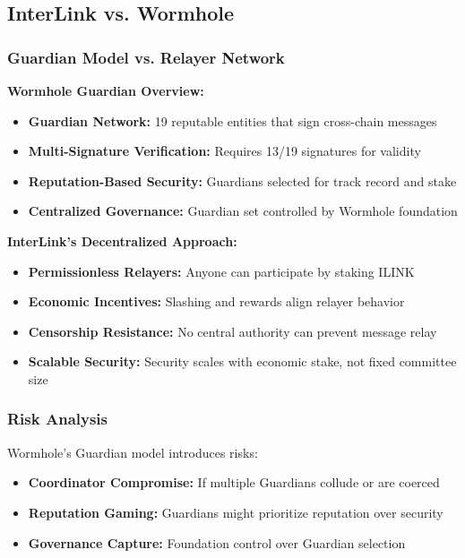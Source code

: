 \documentclass[11pt,a4paper]{article}
\begin{document}
\subsection{InterLink vs. Wormhole}

\subsubsection{Guardian Model vs. Relayer Network}

\textbf{Wormhole Guardian Overview:}
\begin{itemize}
    \item \textbf{Guardian Network:} 19 reputable entities that sign cross-chain messages
    \item \textbf{Multi-Signature Verification:} Requires 13/19 signatures for validity
    \item \textbf{Reputation-Based Security:} Guardians selected for track record and stake
    \item \textbf{Centralized Governance:} Guardian set controlled by Wormhole foundation
\end{itemize}

\textbf{InterLink's Decentralized Approach:}
\begin{itemize}
    \item \textbf{Permissionless Relayers:} Anyone can participate by staking ILINK
    \item \textbf{Economic Incentives:} Slashing and rewards align relayer behavior
    \item \textbf{Censorship Resistance:} No central authority can prevent message relay
    \item \textbf{Scalable Security:} Security scales with economic stake, not fixed committee size
\end{itemize}

\subsubsection{Risk Analysis}

Wormhole's Guardian model introduces risks:
\begin{itemize}
    \item \textbf{Coordinator Compromise:} If multiple Guardians collude or are coerced
    \item \textbf{Reputation Gaming:} Guardians might prioritize reputation over security
    \item \textbf{Governance Capture:} Foundation control over Guardian selection
\end{itemize}
\end{document}
